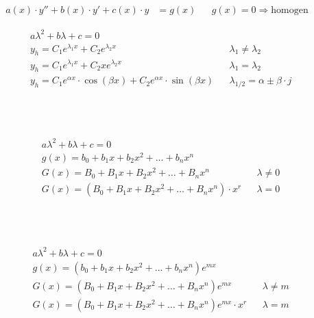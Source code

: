 \begin{boxleft}
\end{boxleft}\begin{boxrightshaded}
\begin{align*}
a(x)\cdot y''+b(x)\cdot y'+c(x)\cdot y&=g(x)&&\text{$g(x)=0\Rightarrow$homogen}
\end{align*}
\end{boxrightshaded}


\begin{boxleft}
\end{boxleft}\begin{boxrightshaded}
\begin{align*}
&a\lambda^2+b\lambda+c=0\\
&y_h=C_1 e^{\lambda_1 x}+C_2 e^{\lambda_2 x}&&\text{$\lambda_1\neq\lambda_2$}\\
&y_h=C_1 e^{\lambda_1 x}+C_2 x e^{\lambda_2 x}&&\text{$\lambda_1=\lambda_2$}\\
&y_h=C_1 e^{\alpha x}\cdot\cos{\left(\beta x\right)}+C_2  e^{\alpha x}\cdot\sin{\left(\beta x\right)}&&\text{$\lambda_{1/2}=\alpha\pm \beta\cdot j$}
\end{align*}
\end{boxrightshaded}

\begin{boxleft}
\\
\\
\end{boxleft}\begin{boxrightshaded}
\begin{align*}
&a\lambda^2+b\lambda+c=0\\
&g(x)=b_0+b_1x+b_2x^2+\dots+b_nx^n\\
&G(x)=B_0+B_1x+B_2x^2+\dots+B_nx^n&&\text{$\lambda\neq 0$}\\
&G(x)=\left(B_0+B_1x+B_2x^2+\dots+B_nx^n\right)\cdot x^r&&\text{$\lambda = 0$}
\end{align*}
\end{boxrightshaded}

\begin{boxleft}
\\
\\
\end{boxleft}\begin{boxrightshaded}
\begin{align*}
&a\lambda^2+b\lambda+c=0\\
&g(x)=\left(b_0+b_1x+b_2x^2+\dots+b_nx^n\right)e^{mx}\\
&G(x)=\left(B_0+B_1x+B_2x^2+\dots+B_nx^n\right)e^{mx}&&\text{$\lambda\neq m$}\\
&G(x)=\left(B_0+B_1x+B_2x^2+\dots+B_nx^n\right)e^{mx}\cdot x^r&&\text{$\lambda = m$}
\end{align*}
\end{boxrightshaded}

